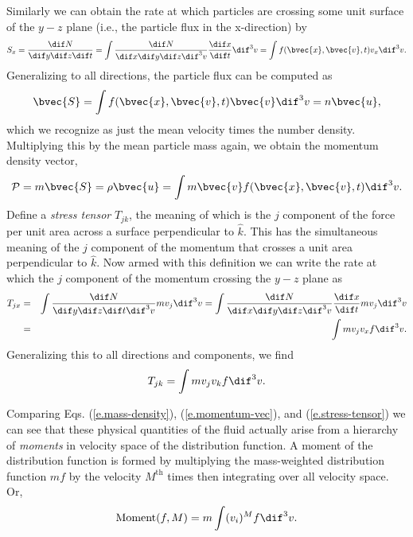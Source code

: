 Similarly we can obtain the rate at which particles are crossing some unit surface of the $y-z$ plane (i.e., the particle flux in the x-direction) by
\begin{equation}
  S_x = \frac{\dif N}{\dif y \dif z \dif t} = \int \frac{\dif N}{\dif x \dif y \dif z \dif^3 v} \frac{\dif x}{\dif t}\dif^3 v = \int f(\bvec{x},\bvec{v},t) v_x \dif^3v.
\end{equation}
Generalizing to all directions, the particle flux can be computed as
\begin{equation}
  \bvec{S} = \int f(\bvec{x},\bvec{v},t) \bvec{v} \dif^3 v = n\bvec{u},
\end{equation}
which we recognize as just the mean velocity times the number density.
Multiplying this by the mean particle mass again, we obtain the momentum density vector,
\begin{equation}
  \mathcal{P} = m\bvec{S} = \rho\bvec{u} = \int m\bvec{v} f(\bvec{x},\bvec{v},t) \dif^3 v. \label{e.momentum-vec}
\end{equation}
Define a {\it stress tensor} $T_{jk}$, the meaning of which is the $j$ component of the force per unit area across a surface perpendicular to $\hat{k}$. This has the simultaneous meaning of the $j$ component of the momentum that crosses a unit area perpendicular to $\hat{k}$.
Now armed with this definition we can write the rate at which the $j$ component of the momentum crossing the $y-z$ plane as
\begin{eqnarray}
  T_{jx} &=& \int \frac{\dif N}{\dif y \dif z \dif t \dif^3v} mv_j \dif^3v = \int \frac{\dif N}{\dif x\dif y \dif z \dif^3v}\frac{\dif x}{\dif t} mv_j \dif^3 v \nonumber \\
  &=& \int mv_jv_x f \dif^3 v.
\end{eqnarray}
Generalizing this to all directions and components, we find
\begin{equation}
  T_{jk} = \int mv_j v_k f \dif^3 v. \label{e.stress-tensor}
\end{equation}

Comparing Eqs. (\ref{e.mass-density}), (\ref{e.momentum-vec}), and (\ref{e.stress-tensor}) we can see that these physical quantities of the fluid actually arise from a hierarchy of {\it moments} in velocity space of the distribution function.
A moment of the distribution function is formed by multiplying the mass-weighted distribution function $mf$ by the velocity $M^\mathrm{th}$ times then integrating over all velocity space. Or,
\begin{equation}
  \mathrm{Moment}(f,M) = m \int (v_i)^M f \dif^3 v. \label{e.moments}
\end{equation}

